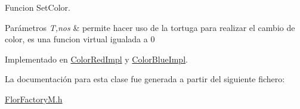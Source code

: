 Funcion Set\+Color. 
\begin{DoxyParams}{Parámetros}
{\em T,nos} & permite hacer uso de la tortuga para realizar el cambio de color, es una funcion virtual igualada a 0 \\
\hline
\end{DoxyParams}


Implementado en \hyperlink{classColorRedImpl_ab094a64f146cc3b6abeea2b60a289f49}{Color\+Red\+Impl} y \hyperlink{classColorBlueImpl_aa18a3e0b37de1bafbd4954fc73df7462}{Color\+Blue\+Impl}.



La documentación para esta clase fue generada a partir del siguiente fichero\+:\begin{DoxyCompactItemize}
\item 
\hyperlink{FlorFactoryM_8h}{Flor\+Factory\+M.\+h}\end{DoxyCompactItemize}
